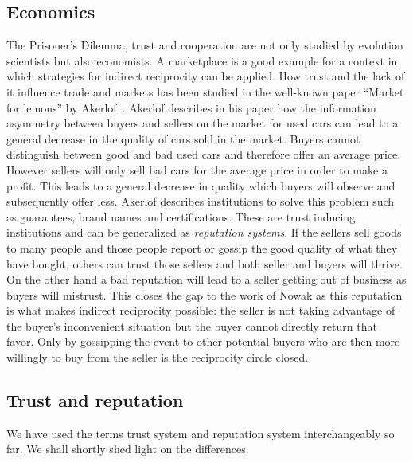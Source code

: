 
\subsection{Economics}
The Prisoner's Dilemma, trust and cooperation are not only studied by evolution scientists but also
economists. A marketplace is a good example for a context in which strategies for indirect reciprocity
can be applied.
How trust and the lack of it influence trade and markets has been studied in the well-known paper ``Market for lemons'' by 
Akerlof~\cite{akerlof1970lemons}. Akerlof describes in his paper how the information asymmetry between buyers and sellers on the market for 
used cars can lead to a general decrease in the quality of cars sold in the market. Buyers cannot 
distinguish between good and bad used cars and therefore offer an average price. However sellers will
only sell bad cars for the average price in order to make a profit. This leads to a general decrease 
in quality which buyers will observe and subsequently offer less. Akerlof
describes institutions to solve this problem such as guarantees, brand names and
certifications. These are trust inducing institutions and can be generalized as \textit{reputation systems}.
If the sellers sell goods to many people and those people report or gossip the good quality of what
they have bought, others can trust those sellers and both seller and buyers will thrive. On the 
other hand a bad reputation will lead to a seller getting out of business as buyers will mistrust.
This closes the gap to the work of Nowak as this reputation is what makes indirect reciprocity
possible: the seller is not taking advantage of the buyer's inconvenient situation but the buyer
cannot directly return that favor. Only by gossipping the event to other potential buyers who are 
then more willingly to buy from the seller is the reciprocity circle closed.~\cite{nowak2006five}

\subsection{Trust and reputation}
We have used the terms trust system and reputation system interchangeably so far. We shall shortly
shed light on the differences. 

